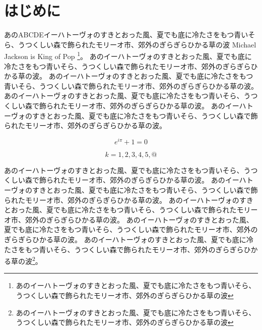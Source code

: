 \documentclass[b5j]{ltjsbook}
\begin{document}
\frontmatter


\chapter*{はじめに}

\textsf{あのABCDE}イーハトーヴォのすきとおった風、夏でも底に冷たさをもつ青いそら、うつくしい森で飾られたモリーオ市、郊外のぎらぎらひかる草の波
Michael Jackson is King of Pop
\footnote{あのイーハトーヴォのすきとおった風、夏でも底に冷たさをもつ青いそら、うつくしい森で飾られたモリーオ市、郊外のぎらぎらひかる草の波}。
あのイーハトーヴォのすきとおった風、夏でも底に冷たさをもつ青いそら、うつくしい森で飾られたモリーオ市、郊外のぎらぎらひかる草の波。
あのイーハトーヴォのすきとおった風、夏でも底に冷たさをもつ青いそら、うつくしい森で飾られたモリーオ市、郊外のぎらぎらひかる草の波。
あのイーハトーヴォのすきとおった風、夏でも底に冷たさをもつ青いそら、うつくしい森で飾られたモリーオ市、郊外のぎらぎらひかる草の波。
あのイーハトーヴォのすきとおった風、夏でも底に冷たさをもつ青いそら、うつくしい森で飾られたモリーオ市、郊外のぎらぎらひかる草の波。

\begin{equation}
e^{i \pi} + 1 = 0
\end{equation}

\begin{equation}
k = 1, 2, 3, 4, 5, @
\end{equation}

あのイーハトーヴォのすきとおった風、夏でも底に冷たさをもつ青いそら、うつくしい森で飾られたモリーオ市、郊外のぎらぎらひかる草の波。
あのイーハトーヴォのすきとおった風、夏でも底に冷たさをもつ青いそら、うつくしい森で飾られたモリーオ市、郊外のぎらぎらひかる草の波。
あのイーハトーヴォのすきとおった風、夏でも底に冷たさをもつ青いそら、うつくしい森で飾られたモリーオ市、郊外のぎらぎらひかる草の波。
あのイーハトーヴォのすきとおった風、夏でも底に冷たさをもつ青いそら、うつくしい森で飾られたモリーオ市、郊外のぎらぎらひかる草の波。
あのイーハトーヴォのすきとおった風、夏でも底に冷たさをもつ青いそら、うつくしい森で飾られたモリーオ市、郊外のぎらぎらひかる草の波\footnote{あのイーハトーヴォのすきとおった風、夏でも底に冷たさをもつ青いそら、うつくしい森で飾られたモリーオ市、郊外のぎらぎらひかる草の波}。
\end{document}
